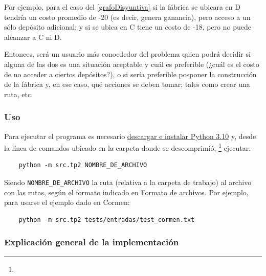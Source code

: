 \documentclass[../tp2_grupo404.tex]{subfiles}
\begin{document}
Por ejemplo, para el caso del \cref{grafoDisyuntiva} si la fábrica se ubicara en
D tendría un costo promedio de -20 (es decir, genera ganancia), pero acceso a un sólo
depósito adicional; y si se ubica en C tiene un costo de -18, pero no puede alcanzar
a C ni D.

Entonces, será un usuario más conocdedor del problema quien podrá decidir si alguna de
las dos es una situación aceptable y cuál es preferible (¿cuál es el costo de no acceder
a ciertos depósitos?), o si sería preferible posponer la construcción de la fábrica y,
en ese caso, qué acciones se deben tomar; tales como crear una ruta, etc.

\subsubsection{Uso}
Para ejecutar el programa es necesario
\href{https://www.python.org/downloads/}{descargar e instalar Python 3.10}
y, desde la línea de comandos ubicado en la carpeta donde se descomprimió,
\footnote{}
ejecutar:
\begin{verbatim}
    python -m src.tp2 NOMBRE_DE_ARCHIVO
\end{verbatim}
Siendo \texttt{NOMBRE\_DE\_ARCHIVO} la ruta (relativa a la carpeta de trabajo)
al archivo con las rutas, según el formato indicado en
\hyperref[enuncFormatoArchivos]{Formato de archivos}.
Por ejemplo, para usarse el ejemplo dado en Cormen:
\begin{verbatim}
    python -m src.tp2 tests/entradas/test_cormen.txt
\end{verbatim}

\subsubsection{Explicación general de la implementación}
\end{document}
